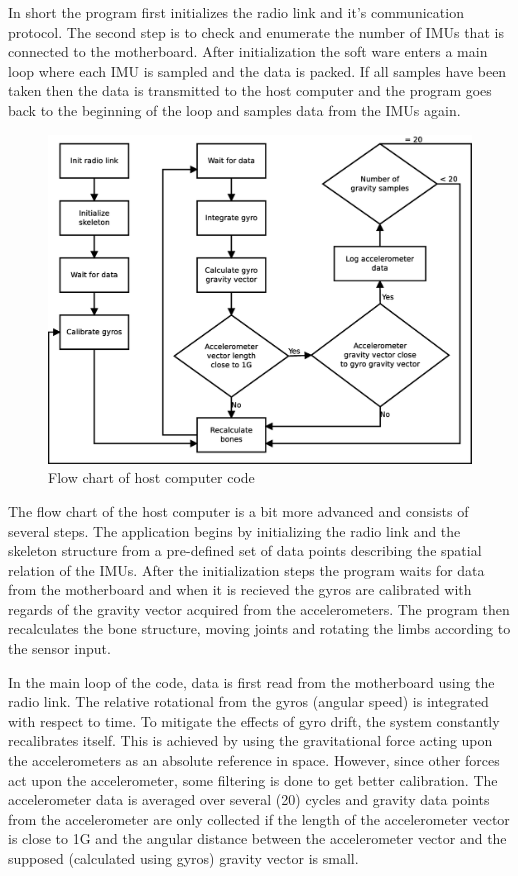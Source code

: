 \documentclass[a4paper, 12pt]{article}
\begin{document}
In short the program first initializes the radio link and it's communication protocol. The second step is to check and enumerate the number of IMUs that is connected to the motherboard. After initialization the soft ware enters a main loop where each IMU is sampled and the data is packed. If all samples have been taken then the data is transmitted to the host computer and the program goes back to the beginning of the loop and samples data from the IMUs again.    

 
\begin{figure}[h!] %
    \centering
    \includegraphics[scale=0.38]{pi.eps}
    \caption{Flow chart of host computer code}
    \label{fig:pic4}
\end{figure}

The flow chart of the host computer is a bit more advanced and consists of several steps. The application begins by initializing the radio link and the skeleton structure from a pre-defined set of data points describing the spatial relation of the IMUs. After the initialization steps the program waits for data from the motherboard and when it is recieved the gyros are calibrated with regards of the gravity vector acquired from the accelerometers. The program then recalculates the bone structure, moving joints and rotating the limbs according to the sensor input.

In the main loop of the code, data is first read from the motherboard using the radio link. The relative rotational  from the gyros (angular speed) is integrated with respect to time. To mitigate the effects of gyro drift, the system constantly recalibrates itself. This is achieved by using the gravitational force acting upon the accelerometers as an absolute reference in space. However, since other forces act upon the accelerometer, some filtering is done to get better calibration. The accelerometer data is averaged over several (20) cycles and gravity data points from the accelerometer are only collected if the length of the accelerometer vector is close to 1G and the angular distance between the accelerometer vector and the supposed (calculated using gyros) gravity vector is small.
\end{document}
